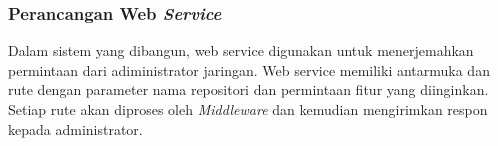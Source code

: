         \subsubsection{Perancangan Web \textit{Service}}
        	Dalam sistem yang dibangun, web service digunakan untuk menerjemahkan permintaan dari adiministrator jaringan. Web service memiliki antarmuka dan rute dengan parameter nama repositori dan permintaan fitur yang diinginkan. Setiap rute akan diproses oleh \textit{Middleware} dan kemudian mengirimkan respon kepada administrator.
         	
        
       
            
        